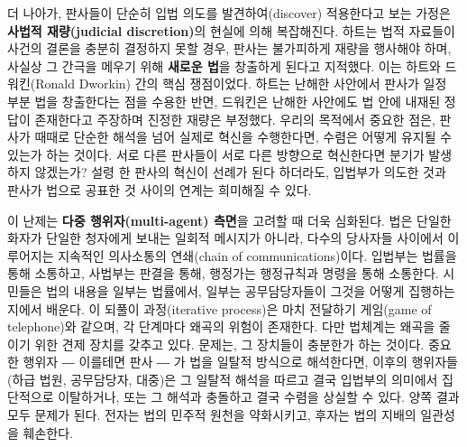 \documentclass[12pt,a4paper]{article}
\begin{document}
더 나아가, 판사들이 단순히 입법 의도를 \textsf{발견하여(discover)}
적용한다고 보는 가정은 \textbf{사법적 재량(judicial discretion)}의
현실에 의해 복잡해진다. 하트는 법적 자료들이 사건의 결론을 충분히
결정하지 못할 경우, 판사는 불가피하게 재량을 행사해야 하며, 사실상 그
간극을 메우기 위해 \textbf{새로운 법}을 창출하게 된다고
지적했다\autocite{hart1994concept}. 이는 하트와 드워킨(Ronald Dworkin) 간의
핵심 쟁점이었다. 하트는 난해한 사안에서 판사가 일정 부분 법을 창출한다는
점을 수용한 반면, 드워킨은 난해한 사안에도 법 안에 내재된 정답이
존재한다고 주장하며 진정한 재량은 부정했다\autocite{dworkin1977rights}.
우리의 목적에서 중요한 점은, 판사가 때때로 단순한 해석을 넘어 실제로
혁신을 수행한다면, 수렴은 어떻게 유지될 수 있는가 하는 것이다. 서로 다른
판사들이 서로 다른 방향으로 혁신한다면 분기가 발생하지 않겠는가? 설령 한
판사의 혁신이 선례가 된다 하더라도, 입법부가 의도한 것과 판사가 법으로
공표한 것 사이의 연계는 희미해질 수 있다.

이 난제는 \textbf{다중 행위자(multi-agent) 측면}을 고려할 때 더욱
심화된다. 법은 단일한 화자가 단일한 청자에게 보내는 일회적 메시지가
아니라, 다수의 당사자들 사이에서 이루어지는 지속적인 의사소통의
연쇄(chain of communications)이다. 입법부는 법률을 통해 소통하고,
사법부는 판결을 통해, 행정가는 행정규칙과 명령을 통해 소통한다. 시민들은
법의 내용을 일부는 법률에서, 일부는 공무담당자들이 그것을 어떻게
집행하는지에서 배운다. 이 되풀이 과정(iterative process)은 마치 전달하기
게임(game of telephone)와 같으며, 각 단계마다 왜곡의 위험이 존재한다.
다만 법체계는 왜곡을 줄이기 위한 견제 장치를 갖추고 있다. 문제는, 그
장치들이 충분한가 하는 것이다. 중요한 행위자 ― 이를테면 판사 ― 가 법을
일탈적 방식으로 해석한다면, 이후의 행위자들(하급 법원, 공무담당자,
대중)은 그 일탈적 해석을 따르고 결국 입법부의 의미에서 집단적으로
이탈하거나, 또는 그 해석과 충돌하고 결국 수렴을 상실할 수 있다. 양쪽
결과 모두 문제가 된다. 전자는 법의 민주적 원천을 약화시키고, 후자는 법의
지배의 일관성을 훼손한다.
\end{document}

